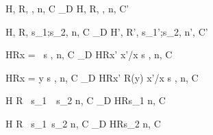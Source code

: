 \begin{figure}
  \begin{minipage}{\textwidth}

   {\langle H, R,
     \Endconst, n, C \rangle \rightarrow_{D} \langle
     H, R, \SKIP , n, C' \rangle}

\vspace{2mm}


\vspace{2mm}  


\vspace{2mm}

{\langle H, R, s_1;s_2, n, C \rangle \xlongrightarrow{\rho}_{D} \langle H', R', s_1';s_2, n', C' \rangle}
 
\vspace{2mm}

{\langle H\coma R\coma  \LET x = \NULL \ \IN s , n, C \rangle
  \longrightarrow_{D}
  \langle H\coma R\Lfc x' \mapsto \NULL \Rfc \coma   \Lb x'/x \Rb s , n, C  \rangle }

\vspace{2mm}

{\langle H\coma R\coma \LET x = y \; \IN s , n, C  \rangle
  \longrightarrow_{D}
  \langle H\coma R\Lfc x' \mapsto R(y) \Rfc \coma   \Lb x'/x \Rb s , n, C\rangle }

\vspace{2mm}

{\langle H \coma R \coma \IFNULL\Sirx \ \THEN   s_{1}\ \ELSE\  s_{2} \coma  n, C \rangle
  \xlongrightarrow{\snull}_D
  \langle H\coma R\coma s_{1} \coma n, C \rangle}

\vspace{2mm}

{\langle H \coma R \coma \IFNULL\Sirx\ \THEN  s_{1}\ \ELSE  s_{2} \coma  n, C\rangle
  \xlongrightarrow{\snnull}_D
  \langle H\coma R\coma s_{2} \coma  n, C\rangle}



\end{minipage}
\end{figure}
